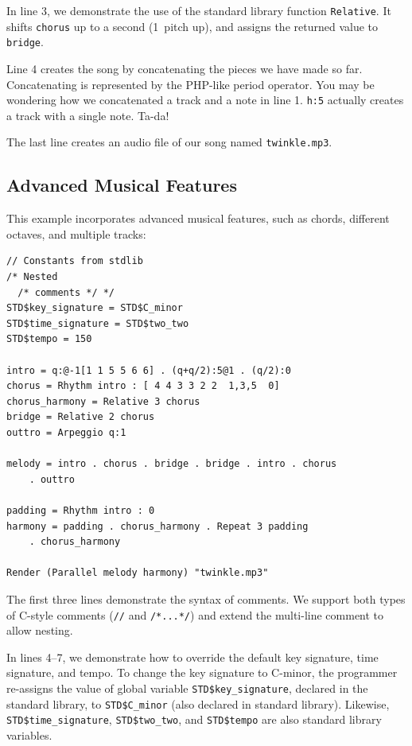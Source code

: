 \documentclass[11pt, onecolumn, letterpaper]{article}
\begin{document}
In line 3, we demonstrate the use of the standard library function \texttt{Relative}. It shifts \texttt{chorus} up to a second (1~pitch up), and assigns the returned value to \texttt{bridge}.

Line 4 creates the song by concatenating the pieces we have made so far. Concatenating is represented by the PHP-like period operator. You may be wondering how we concatenated a track and a note in line 1. \texttt{h:5} actually creates a track with a single note. Ta-da!

The last line creates an audio file of our song named \texttt{twinkle.mp3}.

\newpage
\subsection {Advanced Musical Features}

This example incorporates advanced musical features, such as chords, different octaves, and multiple tracks:


\begin{lstlisting}
// Constants from stdlib
/* Nested
  /* comments */ */
STD$key_signature = STD$C_minor
STD$time_signature = STD$two_two
STD$tempo = 150

intro = q:@-1[1 1 5 5 6 6] . (q+q/2):5@1 . (q/2):0
chorus = Rhythm intro : [ 4 4 3 3 2 2  1,3,5  0]
chorus_harmony = Relative 3 chorus
bridge = Relative 2 chorus
outtro = Arpeggio q:1

melody = intro . chorus . bridge . bridge . intro . chorus
    . outtro

padding = Rhythm intro : 0
harmony = padding . chorus_harmony . Repeat 3 padding
    . chorus_harmony

Render (Parallel melody harmony) "twinkle.mp3"
\end{lstlisting}

The first three lines demonstrate the syntax of comments. We support both types of C-style comments (\texttt{//} and \texttt{/*...*/}) and extend the multi-line comment to allow nesting.

In lines 4--7, we demonstrate how to override the default key signature, time signature, and tempo. To change the key signature to C-minor, the programmer re-assigns the value of global variable \texttt{STD\$key\_signature}, declared in the standard library, to \texttt{STD\$C\_minor} (also declared in standard library). Likewise, \texttt{STD\$time\_signature}, \texttt{STD\$two\_two}, and \texttt{STD\$tempo} are also standard library variables.
\end{document}
